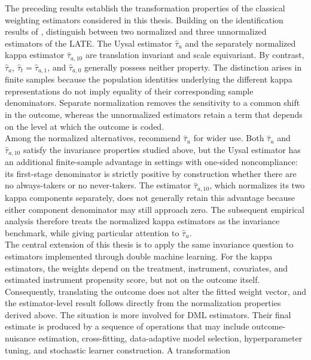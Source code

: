 \documentclass[12pt, a4paper, oneside]{article}
\theoremstyle{plain}
\theoremstyle{definition}
\begin{document}
The preceding results establish the transformation properties of the classical
weighting estimators considered in this thesis. Building on the identification
results of \citet{abadie2003semiparametric},
\citet{sloczynski2025abadie} distinguish between two normalized and three
unnormalized estimators of the LATE. The Uysal estimator
\(\widehat{\tau}_{u}\) and the separately normalized kappa estimator
\(\widehat{\tau}_{a,10}\) are translation invariant and scale equivariant.
By contrast,
\(\widehat{\tau}_{a}\),
\(\widehat{\tau}_{t}=\widehat{\tau}_{a,1}\), and
\(\widehat{\tau}_{a,0}\) generally possess neither property. The distinction
arises in finite samples because the population identities underlying the
different kappa representations do not imply equality of their corresponding
sample denominators. Separate normalization removes the sensitivity to a
common shift in the outcome, whereas the unnormalized estimators retain a
term that depends on the level at which the outcome is coded.\\
Among the normalized alternatives,
\citet{sloczynski2025abadie} recommend
\(\widehat{\tau}_{u}\) for wider use. Both
\(\widehat{\tau}_{u}\) and
\(\widehat{\tau}_{a,10}\) satisfy the invariance properties studied above,
but the Uysal estimator has an additional finite-sample advantage in settings
with one-sided noncompliance: its first-stage denominator is strictly positive
by construction whether there are no always-takers or no never-takers.
The estimator \(\widehat{\tau}_{a,10}\), which normalizes its two kappa
components separately, does not generally retain this advantage because either
component denominator may still approach zero. The subsequent empirical
analysis therefore treats the normalized kappa estimators as the invariance
benchmark, while giving particular attention to
\(\widehat{\tau}_{u}\).\\
The central extension of this thesis is to apply the same invariance question
to estimators implemented through double machine learning. For the kappa
estimators, the weights depend on the treatment, instrument, covariates, and
estimated instrument propensity score, but not on the outcome itself.
Consequently, translating the outcome does not alter the fitted weight vector,
and the estimator-level result follows directly from the normalization
properties derived above. The situation is more involved for DML estimators.
Their final estimate is produced by a sequence of operations that may include
outcome-nuisance estimation, cross-fitting, data-adaptive model selection,
hyperparameter tuning, and stochastic learner construction. A transformation
\end{document}
